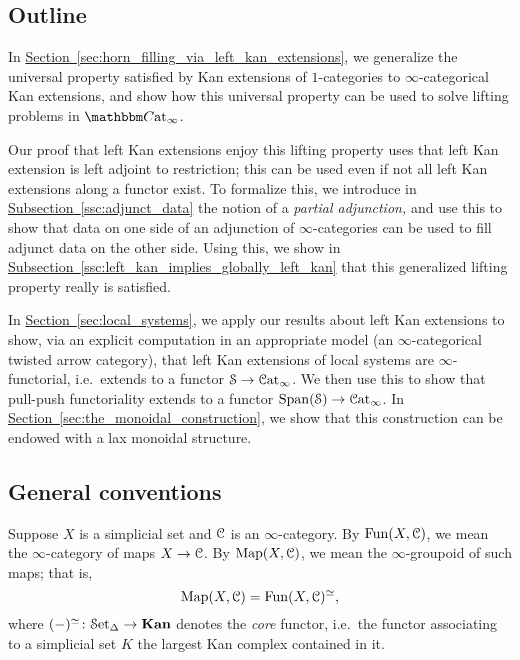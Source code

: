 \documentclass[main.tex]{subfiles}
\begin{document}
\subsection{Outline}
\label{ssc:outline}

In \hyperref[sec:horn_filling_via_left_kan_extensions]{Section~\ref*{sec:horn_filling_via_left_kan_extensions}}, we generalize the universal property satisfied by Kan extensions of $1$-categories to $\infty$-categorical Kan extensions, and show how this universal property can be used to solve lifting problems in $\ICCat$.

Our proof that left Kan extensions enjoy this lifting property uses that left Kan extension is left adjoint to restriction; this can be used even if not all left Kan extensions along a functor exist. To formalize this, we introduce in \hyperref[ssc:adjunct_data]{Subsection~\ref*{ssc:adjunct_data}} the notion of a \emph{partial adjunction,} and use this to show that data on one side of an adjunction of $\infty$-categories can be used to fill adjunct data on the other side. Using this, we show in \hyperref[ssc:left_kan_implies_globally_left_kan]{Subsection~\ref*{ssc:left_kan_implies_globally_left_kan}} that this generalized lifting property really is satisfied.

In \hyperref[sec:local_systems]{Section~\ref*{sec:local_systems}}, we apply our results about left Kan extensions to show, via an explicit computation in an appropriate model (an $\infty$-categorical twisted arrow category), that left Kan extensions of local systems are $\infty$-functorial, i.e.\ extends to a functor $\mathcal{S} \to \mathcal{C}\mathrm{at}_{\infty}$. We then use this to show that pull-push functoriality extends to a functor $\mathrm{Span}(\mathcal{S}) \to \mathcal{C}\mathrm{at}_{\infty}$. In \hyperref[sec:the_monoidal_construction]{Section~\ref*{sec:the_monoidal_construction}}, we show that this construction can be endowed with a lax monoidal structure.

\subsection{General conventions}
\label{ssc:general_conventions}

Suppose $X$ is a simplicial set and $\mathcal{C}$ is an $\infty$-category. By $\mathrm{Fun}(X, \mathcal{C})$, we mean the $\infty$-category of maps $X \to \mathcal{C}$. By $\mathrm{Map}(X, \mathcal{C})$, we mean the $\infty$-groupoid of such maps; that is,
\begin{equation*}
  \mathrm{Map}(X, \mathcal{C}) = \mathrm{Fun}(X, \mathcal{C})^{\simeq},
\end{equation*}
where $(-)^{\simeq}\colon \mathcal{S}\mathrm{et}_{\Delta} \to \mathbf{Kan}$ denotes the \emph{core} functor, i.e.\ the functor associating to a simplicial set $K$ the largest Kan complex contained in it.
\end{document}
